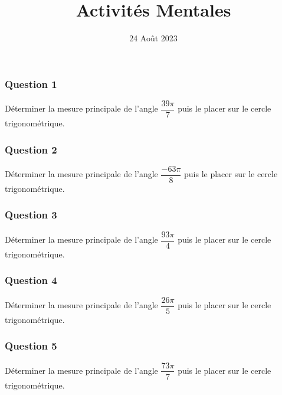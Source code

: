 \documentclass[15pt, mathserif]{beamer}
\title{Activités Mentales}
\date{24 Août 2023}
\begin{document}
\begin{frame}
    \titlepage
\end{frame}

\begin{frame} 
	\frametitle{Question 1}
Déterminer la mesure principale de l'angle $\dfrac{39\pi}{7}$ puis le placer sur le cercle trigonométrique.\end{frame}


\begin{frame} 
	\frametitle{Question 2}
Déterminer la mesure principale de l'angle $\dfrac{-63\pi}{8}$ puis le placer sur le cercle trigonométrique.\end{frame}


\begin{frame} 
	\frametitle{Question 3}
Déterminer la mesure principale de l'angle $\dfrac{93\pi}{4}$ puis le placer sur le cercle trigonométrique.\end{frame}


\begin{frame} 
	\frametitle{Question 4}
Déterminer la mesure principale de l'angle $\dfrac{26\pi}{5}$ puis le placer sur le cercle trigonométrique.\end{frame}


\begin{frame} 
	\frametitle{Question 5}
Déterminer la mesure principale de l'angle $\dfrac{73\pi}{7}$ puis le placer sur le cercle trigonométrique.\end{frame}
\end{document}
